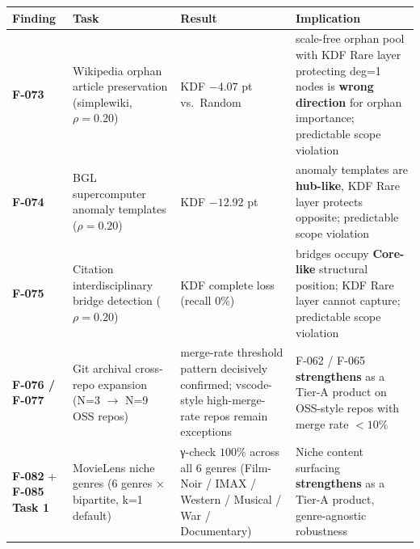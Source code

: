 {\def\LTcaptype{none} %
\begin{longtable}[]{@{}
  >{\raggedright\arraybackslash}p{}
  >{\raggedright\arraybackslash}p{}
  >{\raggedright\arraybackslash}p{}
  >{\raggedright\arraybackslash}p{}@{}}
\toprule\noalign{}
\begin{minipage}[b]{\linewidth}\raggedright
Finding
\end{minipage} & \begin{minipage}[b]{\linewidth}\raggedright
Task
\end{minipage} & \begin{minipage}[b]{\linewidth}\raggedright
Result
\end{minipage} & \begin{minipage}[b]{\linewidth}\raggedright
Implication
\end{minipage} \\
\midrule\noalign{}
\endhead
\bottomrule\noalign{}
\endlastfoot
\textbf{F-073} & Wikipedia orphan article preservation (simplewiki, \(\rho=0.20\)) & KDF \(-4.07\) pt vs.~Random & scale-free orphan pool with KDF Rare layer protecting deg=1 nodes is \textbf{wrong direction} for orphan importance; predictable scope violation \\
\textbf{F-074} & BGL supercomputer anomaly templates (\(\rho=0.20\)) & KDF \(-12.92\) pt & anomaly templates are \textbf{hub-like}, KDF Rare layer protects opposite; predictable scope violation \\
\textbf{F-075} & Citation interdisciplinary bridge detection (\(\rho=0.20\)) & KDF complete loss (recall \(0\%\)) & bridges occupy \textbf{Core-like} structural position; KDF Rare layer cannot capture; predictable scope violation \\
\textbf{F-076 / F-077} & Git archival cross-repo expansion (N=3 \(\to\) N=9 OSS repos) & merge-rate threshold pattern decisively confirmed; vscode-style high-merge-rate repos remain exceptions & F-062 / F-065 \textbf{strengthens} as a Tier-A product on OSS-style repos with merge rate \(< 10\%\) \\
\textbf{F-082} + \textbf{F-085 Task 1} & MovieLens niche genres (6 genres × bipartite, k=1 default) & γ-check \(100\%\) across all 6 genres (Film-Noir / IMAX / Western / Musical / War / Documentary) & Niche content surfacing \textbf{strengthens} as a Tier-A product, genre-agnostic robustness \\

\end{longtable}}
